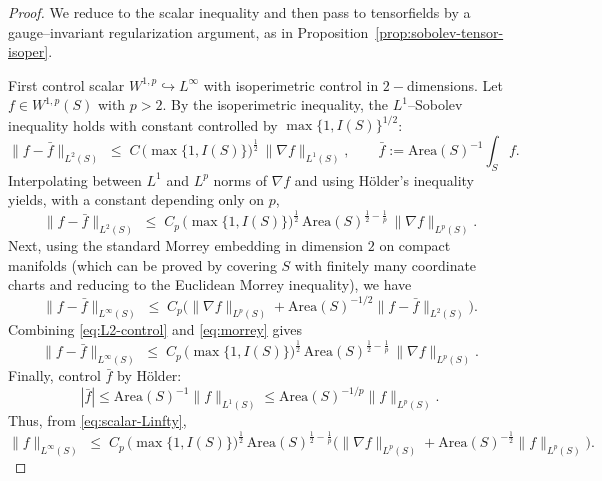 \documentclass{amsart}
\begin{document}
{\begin{proof}
We reduce to the scalar inequality and then pass to tensorfields by a gauge--invariant regularization argument, as in Proposition~\ref{prop:sobolev-tensor-isoper}.

\medskip

\noindent First control scalar $W^{1,p}\hookrightarrow L^\infty$ with isoperimetric control in $2-$dimensions.
Let $f\in W^{1,p}(S)$ with $p>2$. By the isoperimetric inequality, the $L^1$--Sobolev inequality holds with constant controlled by $\max\{1,I(S)\}^{1/2}$:
\begin{equation}\label{eq:L1-sobolev}
\|f-\bar f\|_{L^2(S)}
\;\le\;
C\,\big(\max\{1,I(S)\}\big)^{\frac12}\,\|\nabla f\|_{L^1(S)},
\qquad
\bar f:=\text{Area}(S)^{-1}\int_S f.
\end{equation}
Interpolating between $L^1$ and $L^p$ norms of $\nabla f$ and using Hölder's inequality yields, with a constant depending only on $p$,
\begin{equation}\label{eq:L2-control}
\|f-\bar f\|_{L^2(S)}
\;\le\;
C_p\,\big(\max\{1,I(S)\}\big)^{\frac12}\,
\text{Area}(S)^{\frac12-\frac1p}\,
\|\nabla f\|_{L^p(S)}.
\end{equation}
Next, using the standard Morrey embedding in dimension $2$ on compact manifolds (which can be proved by covering $S$ with finitely many coordinate charts and reducing to the Euclidean Morrey inequality), we have
\begin{equation}\label{eq:morrey}
\|f-\bar f\|_{L^\infty(S)}
\;\le\;
C_p\Big(
\|\nabla f\|_{L^p(S)}+\text{Area}(S)^{-1/2}\|f-\bar f\|_{L^2(S)}
\Big).
\end{equation}
Combining \eqref{eq:L2-control} and \eqref{eq:morrey} gives
\begin{equation}\label{eq:scalar-Linfty}
\|f-\bar f\|_{L^\infty(S)}
\;\le\;
C_p\,\big(\max\{1,I(S)\}\big)^{\frac12}\,
\text{Area}(S)^{\frac12-\frac1p}\,\|\nabla f\|_{L^p(S)}.
\end{equation}
Finally, control $\bar f$ by Hölder:
\[
|\bar f|
\le
\text{Area}(S)^{-1}\|f\|_{L^1(S)}
\le
\text{Area}(S)^{-1/p}\|f\|_{L^p(S)}.
\]
Thus, from \eqref{eq:scalar-Linfty},
\begin{equation}\label{eq:scalar-Linfty-full}
\|f\|_{L^\infty(S)}
\;\le\;
C_p\,\big(\max\{1,I(S)\}\big)^{\frac12}\,
\text{Area}(S)^{\frac12-\frac1p}
\Big(
\|\nabla f\|_{L^p(S)}
+
\text{Area}(S)^{-\frac12}\|f\|_{L^p(S)}
\Big).
\end{equation}


\end{proof}}
\end{document}
